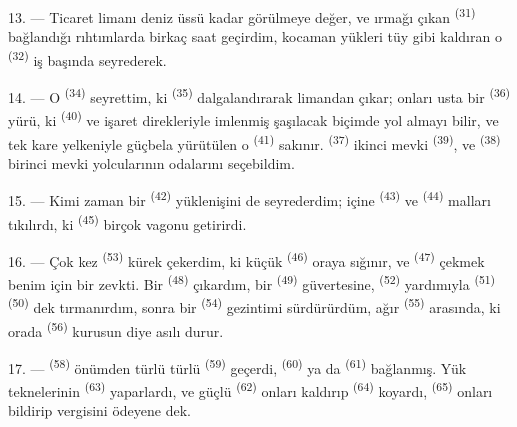 13. --- Ticaret limanı deniz üssü kadar görülmeye değer, ve ırmağı çıkan
 \textsuperscript{(31)} bağlandığı rıhtımlarda birkaç
saat geçirdim, kocaman yükleri tüy gibi kaldıran o 
\textsuperscript{(32)} iş başında seyrederek.

\VUsaut{4.0mm}
\VUsaut{3.0mm}

14. --- O  \textsuperscript{(34)} seyrettim, ki
 \textsuperscript{(35)} dalgalandırarak limandan çıkar; onları
usta bir  \textsuperscript{(36)} yürü, ki
 \textsuperscript{(40)} ve işaret direkleriyle imlenmiş
 şaşılacak biçimde yol almayı bilir, ve tek kare
yelkeniyle güçbela yürütülen o 
\textsuperscript{(41)} sakınır.  \textsuperscript{(37)}
ikinci mevki  \textsuperscript{(39)}, ve  \textsuperscript{(38)} birinci mevki yolcularının odalarını
seçebildim.

15. --- Kimi zaman bir  \textsuperscript{(42)}
yüklenişini de seyrederdim; içine  \textsuperscript{(43)} ve
 \textsuperscript{(44)} malları tıkılırdı, ki
 \textsuperscript{(45)} birçok vagonu getirirdi.

\VUsaut{3.0mm}
\VUsaut{3.0mm}

16. --- Çok kez  \textsuperscript{(53)} kürek
çekerdim, ki küçük  \textsuperscript{(46)} oraya sığınır, ve
 \textsuperscript{(47)} çekmek benim için bir zevkti. Bir
 \textsuperscript{(48)} çıkardım, bir 
\textsuperscript{(49)} güvertesine,  \textsuperscript{(52)}
yardımıyla  \textsuperscript{(51)} 
\textsuperscript{(50)} dek tırmanırdım, sonra bir 
\textsuperscript{(54)} gezintimi sürdürürdüm, ağır  \textsuperscript{(55)} arasında, ki orada 
\textsuperscript{(56)} kurusun diye asılı durur.

17. ---  \textsuperscript{(58)} önümden türlü türlü
 \textsuperscript{(59)} geçerdi, 
\textsuperscript{(60)} ya da  \textsuperscript{(61)}
bağlanmış. Yük teknelerinin  \textsuperscript{(63)}
yaparlardı, ve güçlü  \textsuperscript{(62)} onları kaldırıp
 \textsuperscript{(64)} koyardı, 
 \textsuperscript{(65)} onları bildirip vergisini
ödeyene dek.

